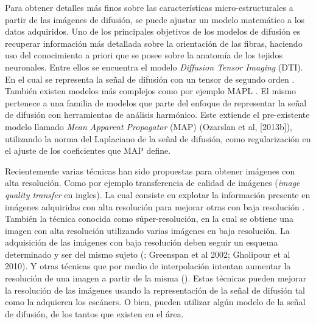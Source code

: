 \documentclass[a4paper,10pt]{article}
\begin{document}
Para obtener detalles más finos sobre las características micro-estructurales a partir de las imágenes de difusión, se 
puede ajustar un modelo matemático a los datos adquiridos. Uno de los principales objetivos de los modelos de difusión 
es recuperar información más detallada sobre la orientación de las fibras, haciendo uso del 
conocimiento a priori que se posee sobre la anatomía de los tejidos neuronales. Entre ellos se 
encuentra el modelo \textit{Diffusion Tensor Imaging} (DTI). En el cual se representa la 
se\~nal de difusión con un tensor de segundo orden \citep{Basser1994}. También existen modelos más 
complejos como por ejemplo MAPL \citep{Fick2016365}. El mismo pertenece a una familia de modelos que parte del enfoque 
de representar la señal de difusión con herramientas de análisis harmónico.
Este extiende el pre-existente modelo llamado \textit{Mean Apparent Propagator} (MAP) (Ozarslan et al, [2013b]), 
utilizando la norma del Laplaciano de la se\~nal de difusión, como regularizaci\'on en el ajuste de los coeficientes 
que MAP define. 


Recientemente varias técnicas han sido propuestas para obtener imágenes con alta resolución. Como 
por ejemplo 
transferencia de calidad de imágenes (\textit{image quality transfer} en ingles). La cual 
consiste en explotar la 
información presente en imágenes adquiridas con alta resolución para mejorar otras con baja resolución 
\citep{Alexander2014}. También la técnica conocida como súper-resolución, en 
la cual se obtiene una imagen con alta resolución utilizando varias imágenes en baja resolución. 
La adquisición de las imágenes con baja 
resolución deben seguir un esquema determinado y ser del mismo sujeto (\cite{Irani1993,Robinson2010}; Greenspan et al 
2002; Gholipour et al 2010). Y otras técnicas que por medio de interpolación 
intentan aumentar la resolución de una imagen a partir de la misma (\cite{Manjon2010}). Estas técnicas pueden 
mejorar la resolución de las imágenes usando la representación de la señal de difusión tal como la adquieren los 
escáners. O bien, pueden utilizar algún modelo de la señal de difusión, de los tantos que existen en el área.
\end{document}
